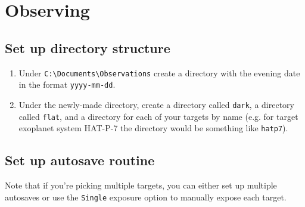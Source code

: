 \documentclass{article}
\begin{document}
	\newpage
	\section{Observing}
	
	\subsection{Set up directory structure}
	
		\begin{enumerate}
			
			\item Under \texttt{C:\textbackslash Documents\textbackslash Observations} create a directory with the evening date in the format \texttt{yyyy-mm-dd}.
			
			\item Under the newly-made directory, create a directory called \texttt{dark}, a directory called \texttt{flat}, and a directory for each of your targets by name (e.g. for target exoplanet system HAT-P-7 the directory would be something like \texttt{hatp7}).
			
		\end{enumerate}
	
	\subsection{Set up autosave routine}
		
		Note that if you're picking multiple targets, you can either set up multiple autosaves or use the \texttt{Single} exposure option to manually expose each target.
		
\end{document}
